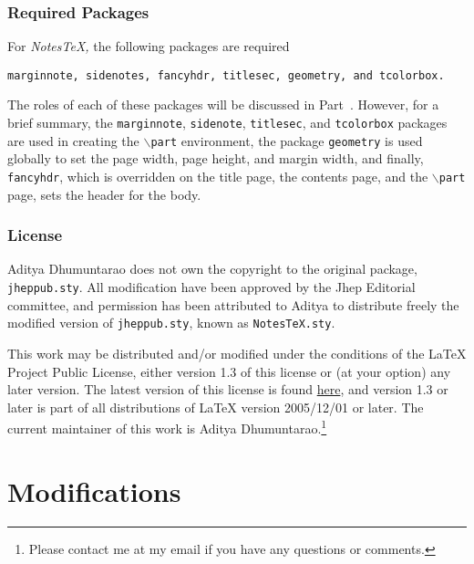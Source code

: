 \documentclass[10pt]{article}
\begin{document}
	\section{Required Packages}\label{sec:reqpackages}
	For \textit{NotesTeX,} the following packages are required
	\begin{center}
		\texttt{marginnote, sidenotes, fancyhdr, titlesec, geometry, and tcolorbox.}
	\end{center}
	The roles of each of these packages will be discussed in Part~\ref{Part:Modification}. However, for a brief summary, the \texttt{marginnote}, \texttt{sidenote}, \texttt{titlesec}, and \texttt{tcolorbox} packages are used in creating the \texttt{$\backslash$part} environment, the package \texttt{geometry} is used globally to set the page width, page height, and margin width, and finally, \texttt{fancyhdr}, which is overridden on the title page, the contents page, and the \texttt{$\backslash$part} page, sets the header for the body.

	\section{License}\label{sec:license}
	Aditya Dhumuntarao does not own the copyright to the original package, \texttt{jheppub.sty}. All modification have been approved by the Jhep Editorial committee, and permission has been attributed to Aditya to distribute freely the modified version of \texttt{jheppub.sty}, known as \texttt{NotesTeX.sty}.

	This work may be distributed and/or modified under the conditions of the LaTeX Project Public License, either version 1.3 of this license or (at your option) any later version. The latest version of this license is found \href{http://www.latex-project.org/lppl.txt}{here}, and version 1.3 or later is part of all distributions of LaTeX version 2005/12/01 or later. The current maintainer of this work is Aditya Dhumuntarao.\footnote{Please contact me at my email if you have any questions or comments.}

	\newpage

	\part{Modifications}\label{Part:Modification}
\end{document}
